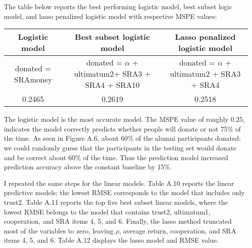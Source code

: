 \documentclass[12pt]{article}
\begin{document}
The table below reports the best performing logistic model, best subset logic model, and lasso penalized logistic model with respective MSPE values:

\vspace{5mm} \begin{adjustbox}{width=\textwidth}
\begin{tabular}{ c | c | c }
\hline \hline
Logistic model & Best subset logistic model & Lasso penalized logistic model \\ 
\hline
\small donated = SRAmoney & donated = \(\alpha\) + ultimatum2+ SRA3 + SRA4 + SRA10 & donated = \(\alpha\) + ultimatum2 + SRA3 + SRA4 \\
 \hline
 0.2465 & 0.2619 & 0.2518 \\  
 \hline \hline
\end{tabular}
\end{adjustbox}

\vspace{5mm} The logistic model is the most accurate model. The MSPE value of roughly 0.25, indicates the model correctly predicts whether people will donate or not 75\% of the time. As seen in Figure A.6, about 60\% of the alumni participants donated: we could randomly guess that the participants in the testing set would donate and be correct about 60\% of the time. Thus the prediction model increased prediction accuracy above the constant baseline by 15\%.


I repeated the same steps for the linear models. Table A.10 reports the linear predictive models; the lowest RMSE corresponds to the model that includes only trust2. Table A.11 reports the top five best subset linear models, where the lowest RMSE belongs to the model that contains trust2, ultimatum1, cooperation, and SRA items 4, 5, and 6. Finally, the lasso method truncated most of the variables to zero, leaving \(\rho\), average return, cooperation, and SRA items 4, 5, and 6. Table A.12 displays the lasso model and RMSE value.

\end{document}
